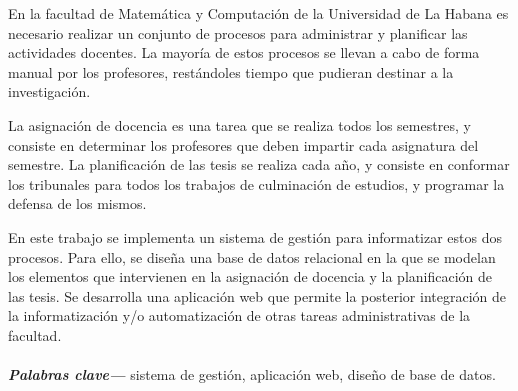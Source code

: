 \begin{resumen}
	En la facultad de Matemática y Computación de la Universidad de La Habana es necesario realizar un conjunto de
    procesos para administrar y planificar las actividades docentes. La mayoría de estos procesos se llevan a cabo
    de forma manual por los profesores, restándoles tiempo que pudieran destinar a la investigación.

    La asignación de docencia es una tarea que se realiza todos los semestres, y consiste en determinar los profesores  
    que deben impartir cada asignatura del semestre. 
    La planificación de las tesis se realiza cada año, y consiste en conformar los tribunales para todos los
    trabajos de culminación de estudios, y programar la defensa de los mismos.

    En este trabajo se implementa
    un sistema de gestión para informatizar estos dos procesos.
    Para ello, se diseña una base de datos relacional en la que se modelan los elementos que intervienen en 
    la asignación de docencia y la planificación de las tesis. 
    Se desarrolla una aplicación web que permite la posterior integración de la informatización y/o automatización 
    de otras tareas administrativas de la facultad.




    \paragraph*{}
  \textbf{\emph{Palabras clave---}} sistema de gestión, aplicación web, diseño de base de datos.
\end{resumen}

